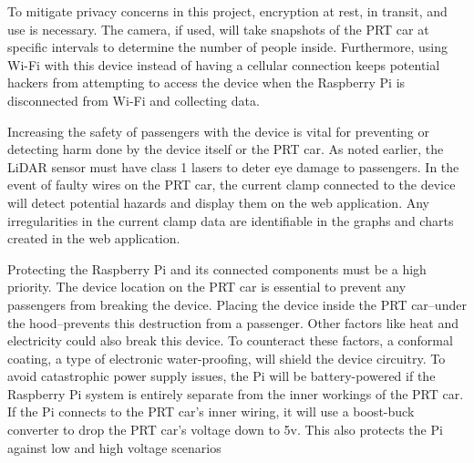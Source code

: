 To mitigate privacy concerns in this project, encryption at rest, in transit, and use is necessary. 
The camera, if used, will take snapshots of the PRT car at specific intervals to determine the number of people inside. 
Furthermore, using Wi-Fi with this device instead of having a cellular connection keeps potential hackers from attempting to access the device when the Raspberry Pi is disconnected from Wi-Fi and collecting data.

Increasing the safety of passengers with the device is vital for preventing or detecting harm done by the device itself or the PRT car. 
As noted earlier, the LiDAR sensor must have class 1 lasers to deter eye damage to passengers. 
In the event of faulty wires on the PRT car, the current clamp connected to the device will detect potential hazards and display them on the web application. 
Any irregularities in the current clamp data are identifiable in the graphs and charts created in the web application.

Protecting the Raspberry Pi and its connected components must be a high priority. 
The device location on the PRT car is essential to prevent any passengers from breaking the device. 
Placing the device inside the  PRT car–under the hood–prevents this destruction from a passenger. 
Other factors like heat and electricity could also break this device. 
To counteract these factors, a conformal coating, a type of electronic water-proofing, will shield the device circuitry. 
To avoid catastrophic power supply issues, the Pi will be battery-powered if the Raspberry Pi system is entirely separate from the inner workings of the PRT car. 
If the Pi connects to the PRT car's inner wiring, it will use a boost-buck converter to drop the PRT car’s voltage down to 5v. 
This also protects the Pi against low and high voltage scenarios
